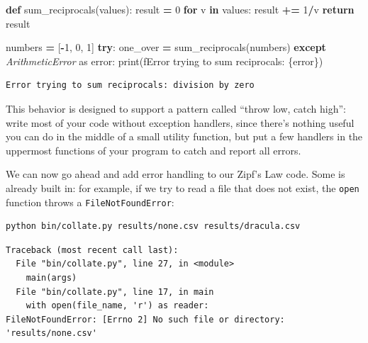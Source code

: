 \documentclass[
]{krantz}
\makeatletter
\newenvironment{Shaded}{\begin{snugshade}}{\end{snugshade}}
\newcommand{\BuiltInTok}[1]{#1}
\newcommand{\ControlFlowTok}[1]{\textcolor[rgb]{0.13,0.29,0.53}{\textbf{#1}}}
\newcommand{\DecValTok}[1]{\textcolor[rgb]{0.00,0.00,0.81}{#1}}
\newcommand{\ImportTok}[1]{#1}
\newcommand{\KeywordTok}[1]{\textcolor[rgb]{0.13,0.29,0.53}{\textbf{#1}}}
\newcommand{\NormalTok}[1]{#1}
\newcommand{\OperatorTok}[1]{\textcolor[rgb]{0.81,0.36,0.00}{\textbf{#1}}}
\newcommand{\PreprocessorTok}[1]{\textcolor[rgb]{0.56,0.35,0.01}{\textit{#1}}}
\newcommand{\SpecialCharTok}[1]{\textcolor[rgb]{0.00,0.00,0.00}{#1}}
\newcommand{\SpecialStringTok}[1]{\textcolor[rgb]{0.31,0.60,0.02}{#1}}
\newenvironment{kframe}{%
\medskip{}
\setlength{\fboxsep}{.8em}
 \def\at@end@of@kframe{}%
 \ifinner\ifhmode%
  \def\at@end@of@kframe{\end{minipage}}%
  \begin{minipage}{\columnwidth}%
 \fi\fi%
 \def\FrameCommand##1{\hskip\@totalleftmargin \hskip-\fboxsep
 \colorbox{shadecolor}{##1}\hskip-\fboxsep
     \hskip-\linewidth \hskip-\@totalleftmargin \hskip\columnwidth}%
 \MakeFramed {\advance\hsize-\width
   \@totalleftmargin\z@ \linewidth\hsize
   \@setminipage}}%
 {\par\unskip\endMakeFramed%
 \at@end@of@kframe}
\renewenvironment{Shaded}{\begin{kframe}}{\end{kframe}}
\makeatother
\begin{document}
\begin{Shaded}
\begin{Highlighting}[]
\KeywordTok{def}\NormalTok{ sum\_reciprocals(values):}
\NormalTok{    result }\OperatorTok{=} \DecValTok{0}
    \ControlFlowTok{for}\NormalTok{ v }\KeywordTok{in}\NormalTok{ values:}
\NormalTok{        result }\OperatorTok{+=} \DecValTok{1}\OperatorTok{/}\NormalTok{v}
    \ControlFlowTok{return}\NormalTok{ result}

\NormalTok{numbers }\OperatorTok{=}\NormalTok{ [}\OperatorTok{{-}}\DecValTok{1}\NormalTok{, }\DecValTok{0}\NormalTok{, }\DecValTok{1}\NormalTok{]}
\ControlFlowTok{try}\NormalTok{:}
\NormalTok{    one\_over }\OperatorTok{=}\NormalTok{ sum\_reciprocals(numbers)}
\ControlFlowTok{except} \PreprocessorTok{ArithmeticError} \ImportTok{as}\NormalTok{ error:}
    \BuiltInTok{print}\NormalTok{(}\SpecialStringTok{f\textquotesingle{}Error trying to sum reciprocals: }\SpecialCharTok{\{}\NormalTok{error}\SpecialCharTok{\}}\SpecialStringTok{\textquotesingle{}}\NormalTok{)}
\end{Highlighting}
\end{Shaded}

\begin{verbatim}
Error trying to sum reciprocals: division by zero
\end{verbatim}

This behavior is designed to support a pattern called ``throw low, catch high'':
write most of your code without exception handlers,
since there's nothing useful you can do in the middle of a small utility function,
but put a few handlers in the uppermost functions of your program
to catch and report all errors.

We can now go ahead and add error handling to our Zipf's Law code.
Some is already built in:
for example,
if we try to read a file that does not exist,
the \texttt{open} function throws a \texttt{FileNotFoundError}:

\begin{verbatim}
python bin/collate.py results/none.csv results/dracula.csv
\end{verbatim}

\begin{verbatim}
Traceback (most recent call last):
  File "bin/collate.py", line 27, in <module>
    main(args)
  File "bin/collate.py", line 17, in main
    with open(file_name, 'r') as reader:
FileNotFoundError: [Errno 2] No such file or directory: 'results/none.csv'
\end{verbatim}
\end{document}
